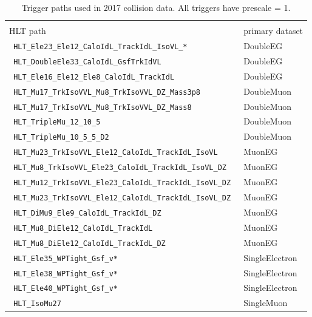 \begin{table*}
  \caption{Trigger paths used in 2017 collision data. All triggers have prescale = 1.}
  \label{tab:triggerpaths2017}
  \scriptsize
  \centering
  \begin{tabular}{ l l }
    \toprule %
    \shortstack{{}\\[.15ex] \normalsize{HLT path}}              & \normalsize{primary dataset} \\
    \midrule %
    \verb| HLT_Ele23_Ele12_CaloIdL_TrackIdL_IsoVL_*           | & DoubleEG \\
    \verb| HLT_DoubleEle33_CaloIdL_GsfTrkIdVL                 | & DoubleEG \\
    \verb| HLT_Ele16_Ele12_Ele8_CaloIdL_TrackIdL              | & DoubleEG \\
    \verb| HLT_Mu17_TrkIsoVVL_Mu8_TrkIsoVVL_DZ_Mass3p8        | & DoubleMuon \\
    \verb| HLT_Mu17_TrkIsoVVL_Mu8_TrkIsoVVL_DZ_Mass8          | & DoubleMuon \\
    \verb| HLT_TripleMu_12_10_5                               | & DoubleMuon \\
    \verb| HLT_TripleMu_10_5_5_D2                             | & DoubleMuon \\
    \verb| HLT_Mu23_TrkIsoVVL_Ele12_CaloIdL_TrackIdL_IsoVL    | & MuonEG \\
    \verb| HLT_Mu8_TrkIsoVVL_Ele23_CaloIdL_TrackIdL_IsoVL_DZ  | & MuonEG \\
    \verb| HLT_Mu12_TrkIsoVVL_Ele23_CaloIdL_TrackIdL_IsoVL_DZ | & MuonEG \\
    \verb| HLT_Mu23_TrkIsoVVL_Ele12_CaloIdL_TrackIdL_IsoVL_DZ | & MuonEG \\
    \verb| HLT_DiMu9_Ele9_CaloIdL_TrackIdL_DZ                 | & MuonEG \\
    \verb| HLT_Mu8_DiEle12_CaloIdL_TrackIdL                   | & MuonEG \\
    \verb| HLT_Mu8_DiEle12_CaloIdL_TrackIdL_DZ                | & MuonEG \\
    \verb| HLT_Ele35_WPTight_Gsf_v*                           | & SingleElectron \\
    \verb| HLT_Ele38_WPTight_Gsf_v*                           | & SingleElectron \\
    \verb| HLT_Ele40_WPTight_Gsf_v*                           | & SingleElectron \\
    \verb| HLT_IsoMu27                                        | & SingleMuon \\
    \bottomrule %
  \end{tabular}
\end{table*}

